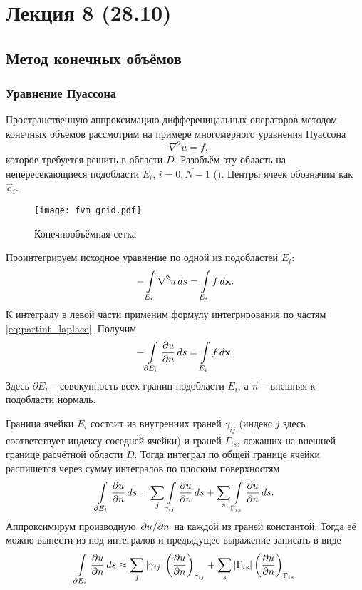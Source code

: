 \section{Лекция 8 (28.10)}

\subsection{Метод конечных объёмов}
\subsubsection{Уравнение Пуассона}
Пространственную аппроксимацию дифференицальных операторов
методом конечных объёмов рассмотрим на примере многомерного уравнения Пуассона
\begin{equation}
\label{eq:fvm_pois}
-\nabla^2 u = f,
\end{equation}
которое требуется решить в области $D$. Разобъём эту область
на непересекающиеся подобласти $E_i$, $i = \overline{0, N-1}$ ().
Центры ячеек обозначим как $\vec c_i$.

\begin{figure}[h!]
\centering
\texttt{[image: fvm\_grid.pdf]}
\caption{Конечнообъёмная сетка}
\label{fig:fvm_grid}
\end{figure}

Проинтегрируем исходное уравнение
по одной из подобластей $E_i$:
\begin{equation*}
-\arint{\nabla^2 u}{E_i}{s} = \arint{f}{E_i}{\vec x}.
\end{equation*}
К интегралу в левой части применим формулу интегрирования по частям \cref{eq:partint_laplace}. Получим
\begin{equation}
\label{eq:fvm_pois_int}
-\arint{\dfr{u}{n}}{\partial E_i}{s} = \arint{f}{E_i}{\vec x}.
\end{equation}
Здесь $\partial E_i$ -- совокупность всех границ подобласти $E_i$,
а $\vec n$ -- внешняя к подобласти нормаль.

Граница ячейки $E_i$ состоит из внутренних граней $\gamma_{ij}$ (индекс $j$ здесь
соответствует индексу соседней ячейки)
и граней $\Gamma_{is}$, лежащих на внешней границе расчётной области $D$.
Тогда интеграл по общей границе ячейки распишется через сумму интегралов по плоским поверхностям
$$
\arint{\dfr{u}{n}}{\partial E_i}{s} = \sum_j\arint{\dfr{u}{n}}{\gamma_{ij}}{s} + \sum_s\arint{\dfr{u}{n}}{\Gamma_{is}}{s}.
$$
Аппроксимирум производную $\dsfr{u}{n}$ на каждой из граней константой.
Тогда её можно вынести из под интегралов и предыдущее выражение записать в виде
\begin{equation}
\label{eq:fvm_gamma_integral}
\arint{\dfr{u}{n}}{\partial E_i}{s} \approx
\sum_j
    \left|
        \gamma_{ij}
    \right|
    \left(
        \dfr{u}{n}
    \right)_{\gamma_{ij}}
+\sum_s
    \left|
        \Gamma_{is}
    \right|
    \left(
        \dfr{u}{n}
    \right)_{\Gamma_{is}}
\end{equation}

